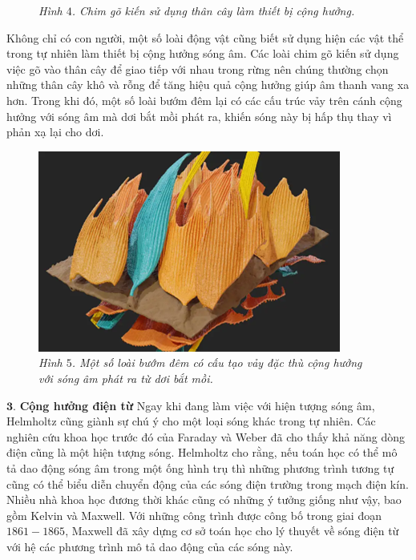 \begin{multicols}{2}
\begin{figure}[H]
		\caption{\small\textit{\color{timhieukhoahoc}Hình $4$. Chim gõ kiến sử dụng thân cây làm thiết bị cộng hưởng.}}
		\vspace*{-10pt}
	\end{figure}
	Không chỉ có con người, một số loài động vật cũng biết sử dụng hiện các vật thể trong tự nhiên làm thiết bị cộng hưởng sóng âm. Các loài chim gõ kiến sử dụng việc gõ vào thân cây để giao tiếp với nhau trong rừng nên chúng thường chọn những thân cây khô và rỗng để tăng hiệu quả cộng hưởng giúp âm thanh vang xa hơn. Trong khi đó, một số loài bướm đêm lại có các cấu trúc vảy trên cánh cộng hưởng với sóng âm mà dơi bắt mồi phát ra, khiến sóng này bị hấp thụ thay vì phản xạ lại cho dơi.
	\begin{figure}[H]
		\centering
		\vspace*{-5pt}
		\captionsetup{labelformat= empty, justification=centering}
		\includegraphics[width=1\linewidth]{7}
		\caption{\small\textit{\color{timhieukhoahoc}Hình $5$. Một số loài bướm đêm có cấu tạo vảy đặc thù cộng hưởng với sóng âm phát ra từ dơi bắt mồi.}}
		\vspace*{-10pt}
	\end{figure}
	$\pmb{3.}$ \textbf{\color{timhieukhoahoc}Cộng hưởng điện từ}
	\vskip 0.1cm
	Ngay khi đang làm việc với hiện tượng sóng âm, Helmholtz cũng giành sự chú ý cho một loại sóng khác trong tự nhiên. Các nghiên cứu khoa học trước đó của Faraday và Weber đã cho thấy khả năng dòng điện cũng là một hiện tượng sóng. Helmholtz cho rằng, nếu toán học có thể mô tả dao động sóng âm trong một ống hình trụ thì những phương trình tương tự cũng có thể biểu diễn chuyển động của các sóng điện trường trong mạch điện kín. Nhiều nhà khoa học đương thời khác cũng có những ý tưởng giống như vậy, bao gồm Kelvin và Maxwell. Với những công trình được công bố trong giai đoạn $1861-1865$, Maxwell đã xây dựng cơ sở toán học cho lý thuyết về sóng điện từ với hệ các phương trình mô tả dao động của các sóng này.

\end{multicols}

